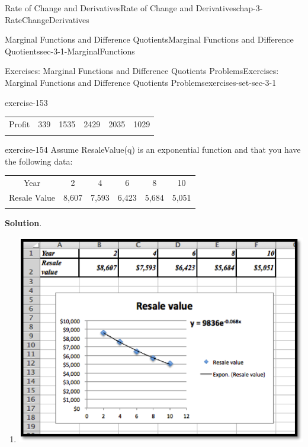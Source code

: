 \documentclass[oneside,10pt,]{book}
\numberwithin{equation}{section}
\newcommand{\hrulethin}  {\noalign{\hrule height 0.04em}}
\newcommand{\hrulethick} {\noalign{\hrule height 0.11em}}
\begin{document}
\begin{chapterptx}{Rate of Change and Derivatives}{}{Rate of Change and Derivatives}{}{}{chap-3-RateChangeDerivatives}
\begin{sectionptx}{Marginal Functions and Difference Quotients}{}{Marginal Functions and Difference Quotients}{}{}{sec-3-1-MarginalFunctions}
\begin{exercises-subsection-numberless}{Exercises: Marginal Functions and Difference Quotients Problems}{}{Exercises: Marginal Functions and Difference Quotients Problems}{}{}{exercises-set-sec-3-1}
\begin{exercisegroup}
\begin{divisionexerciseeg}{14}{}{}{exercise-153}
\begin{sidebyside}{1}{0}{0}{0}
\begin{sbspanel}{1}
{\begin{tabular}{cccccc}
Profit&339&1535&2429&2035&1029\tabularnewline\hrulethin
\end{tabular}
\par}
\end{sbspanel}%
\end{sidebyside}%
\end{divisionexerciseeg}%
\begin{divisionexerciseeg}{15}{}{}{exercise-154}%
\hypertarget{p-1002}{}%
Assume ResaleValue(q) is an exponential function and that you have the following data:%
\begin{sidebyside}{1}{0}{0}{0}%
\begin{sbspanel}{1}%
{\centering%
\begin{tabular}{cccccc}\hrulethick
Year&2&4&6&8&10\tabularnewline\hrulethin
Resale Value&\textdollar{}8,607&\textdollar{}7,593&\textdollar{}6,423&\textdollar{}5,684&\textdollar{}5,051\tabularnewline\hrulethin
\end{tabular}
\par}
\end{sbspanel}%
\end{sidebyside}%
\par\smallskip%
\noindent\textbf{Solution}.\hypertarget{solution-75}{}\quad%
\leavevmode%
\begin{enumerate}[label=(\alph*)]
\item\hypertarget{li-311}{}\leavevmode%
\begin{sidebyside}{1}{0.2}{0.2}{0}%
\begin{sbspanel}{0.6}%
\includegraphics[width=1\linewidth]{images/sec3-1-sol15a.png}
\end{sbspanel}%
\end{sidebyside}%

\end{enumerate}
\end{divisionexerciseeg}
\end{exercisegroup}
\end{exercises-subsection-numberless}
\end{sectionptx}
\end{chapterptx}
\end{document}
